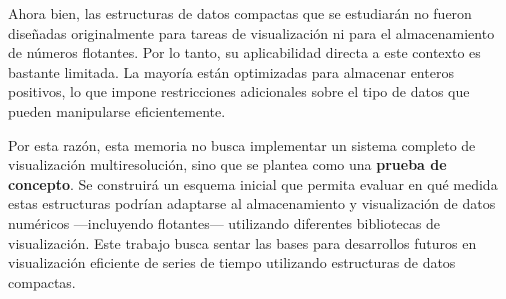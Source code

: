 Ahora bien, las estructuras de datos compactas que se estudiarán no fueron diseñadas originalmente para tareas de visualización ni para el almacenamiento de números flotantes. Por lo tanto, su aplicabilidad directa a este contexto es bastante limitada. La mayoría están optimizadas para almacenar enteros positivos, lo que impone restricciones adicionales sobre el tipo de datos que pueden manipularse eficientemente.

Por esta razón, esta memoria no busca implementar un sistema completo de visualización multiresolución, sino que se plantea como una \textbf{prueba de concepto}. Se construirá un esquema inicial que permita evaluar en qué medida estas estructuras podrían adaptarse al almacenamiento y visualización de datos numéricos —incluyendo flotantes— utilizando diferentes bibliotecas de visualización. Este trabajo busca sentar las bases para desarrollos futuros en visualización eficiente de series de tiempo utilizando estructuras de datos compactas.
